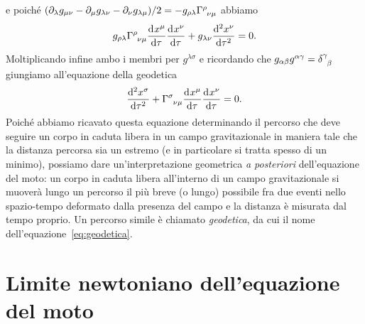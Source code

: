 e poiché
$(\partial_{\lambda} g_{\mu\nu} - \partial_{\mu}g_{\lambda\nu}
- \partial_{\nu}g_{\lambda\mu})/2 = -g_{\rho\lambda}
\tensor{\Gamma}{^{\rho}_{\nu\mu}}$ abbiamo
\begin{equation}
  g_{\rho\lambda} \tensor{\Gamma}{^{\rho}_{\nu\mu}} \toder{x^{\mu}}{\tau}
  \toder{x^{\nu}}{\tau} + g_{\lambda\nu}\toder[2]{x^{\nu}}{\tau} = 0.
\end{equation}
Moltiplicando infine ambo i membri per $g^{\lambda\sigma}$ e ricordando che
$g_{\alpha\beta}g^{\alpha\gamma} = \tensor{\delta}{^{\gamma}_{\beta}}$ giungiamo
all'equazione della geodetica
\begin{equation}
  \toder[2]{x^{\sigma}}{\tau} + \tensor{\Gamma}{^{\sigma}_{\nu\mu}}
  \toder{x^{\mu}}{\tau} \toder{x^{\nu}}{\tau} = 0.
\end{equation}
Poiché abbiamo ricavato questa equazione determinando il percorso che deve
seguire un corpo in caduta libera in un campo gravitazionale in maniera tale che
la distanza percorsa sia un estremo (e in particolare si tratta spesso di un
minimo), possiamo dare un'interpretazione geometrica \emph{a posteriori}
dell'equazione del moto: un corpo in caduta libera all'interno di un campo
gravitazionale si muoverà lungo un percorso il più breve (o lungo) possibile fra
due eventi nello spazio-tempo deformato dalla presenza del campo e la distanza è
misurata dal tempo proprio.  Un percorso simile è chiamato \emph{geodetica}, da
cui il nome dell'equazione~\eqref{eq:geodetica}.

\section{Limite newtoniano dell'equazione del moto}
\label{sec:limite-newtoniano}

